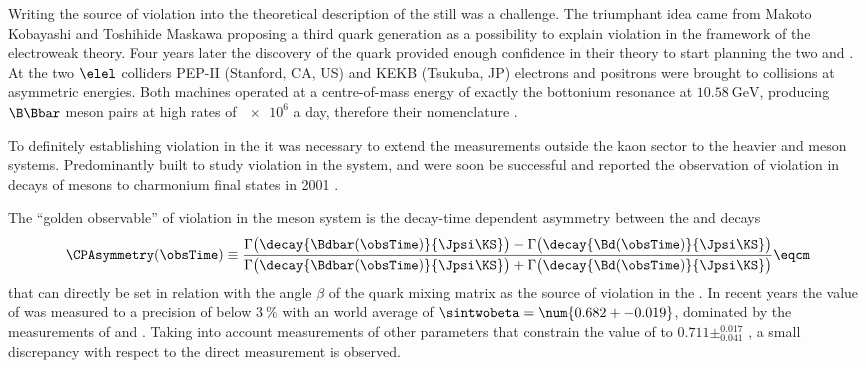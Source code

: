Writing the source of \CP violation into the theoretical description of the  \SM
still was a challenge. The triumphant idea came from Makoto Kobayashi and
Toshihide Maskawa \cite{Kobayashi:1973fv} proposing a third quark generation as
a possibility to explain \CP violation in the framework of the electroweak
theory. Four years later the discovery of the \bquark quark \cite{Herb:1977ek}
provided enough confidence in their theory to start planning the two \BFactories
\Babar and \Belle. At the two $\elel$ colliders PEP-II (Stanford, CA, US) and
KEKB (Tsukuba, JP) electrons and positrons were brought to collisions at
asymmetric energies. Both machines operated at a centre-of-mass energy of
exactly the \YFourS bottonium resonance at $\SI{10.58}{\GeV}$, producing
$\B\Bbar$ meson pairs at high rates of $\num{e6}$ a day, therefore their
nomenclature \cite{Bevan:2014iga}.

To definitely establishing \CP violation in the \SM it was necessary to extend
the measurements outside the kaon sector to the heavier \B and \D meson systems.
Predominantly built to study \CP violation in the \Bmeson system, \Babar and
\Belle were soon be successful and reported the observation of \CP violation in
decays of \Bd mesons to charmonium final states in 2001
\cite{Aubert:2001nu,Abe:2001xe}.

The \enquote{golden observable} \cite{Bevan:2014iga} of \CP violation in the \Bd
meson system is the decay-time dependent \CP asymmetry between the  \BdToJpsiKS
and \BdbarToJpsiKS decays
%
\begin{equation*}\label{eq:cpv_theory:bd2jpsiks:cp_asymmetry}
    \CPAsymmetry(\obsTime) \equiv 
      \frac{\Gamma\bigl(\decay{\Bdbar(\obsTime)}{\Jpsi\KS}\bigr) - \Gamma\bigl(\decay{\Bd(\obsTime)}{\Jpsi\KS}\bigr)}
           {\Gamma\bigl(\decay{\Bdbar(\obsTime)}{\Jpsi\KS}\bigr) + \Gamma\bigl(\decay{\Bd(\obsTime)}{\Jpsi\KS}\bigr)} \eqcm
\end{equation*}
%
that can directly be set in relation with the angle $\beta$ of the \CKM quark
mixing matrix as the source of \CP violation in the \SM. In recent years the
value of \sintwobeta was measured to a precision of below $\SI{3}{\percent}$
with an world average of $\sintwobeta = \num{0.682 +- 0.019}$, dominated by the
measurements of \Babar and \Belle \cite{Amhis:2014hma}. Taking into account
measurements of other parameters that constrain the value of \sintwobeta to
$0.711\pm^{0.017}_{0.041}$ \cite{Charles:2015gya}, a small discrepancy with
respect to the direct measurement is observed.


